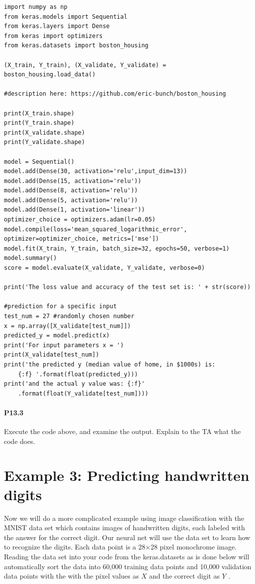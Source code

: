 \documentclass{book}
\theoremstyle{plain}
\theoremstyle{definition}
\numberwithin{exm}{chapter}
\theoremstyle{remark}
\theoremstyle{summary}
\theoremstyle{overview}
\begin{document}
\begin{lstlisting}
import numpy as np
from keras.models import Sequential
from keras.layers import Dense
from keras import optimizers
from keras.datasets import boston_housing

(X_train, Y_train), (X_validate, Y_validate) = boston_housing.load_data()

#description here: https://github.com/eric-bunch/boston_housing

print(X_train.shape)
print(Y_train.shape)
print(X_validate.shape)
print(Y_validate.shape)

model = Sequential()
model.add(Dense(30, activation='relu',input_dim=13))
model.add(Dense(15, activation='relu'))
model.add(Dense(8, activation='relu'))
model.add(Dense(5, activation='relu'))
model.add(Dense(1, activation='linear'))
optimizer_choice = optimizers.adam(lr=0.05)
model.compile(loss='mean_squared_logarithmic_error',
optimizer=optimizer_choice, metrics=['mse'])
model.fit(X_train, Y_train, batch_size=32, epochs=50, verbose=1)
model.summary()
score = model.evaluate(X_validate, Y_validate, verbose=0)

print('The loss value and accuracy of the test set is: ' + str(score))

#prediction for a specific input
test_num = 27 #randomly chosen number
x = np.array([X_validate[test_num]])
predicted_y = model.predict(x)
print('For input parameters x = ')
print(X_validate[test_num])
print('the predicted y (median value of home, in $1000s) is:
	{:f} '.format(float(predicted_y)))
print('and the actual y value was: {:f}'
	.format(float(Y_validate[test_num])))
\end{lstlisting}
\paragraph*{P13.3} Execute the code above, and examine the output. Explain to the TA what
the code does.


\section*{Example 3: Predicting handwritten digits}
Now we will do a more complicated example using image classification with the
MNIST data set which contains images of handwritten digits, each labeled with
the answer for the correct digit. Our neural net will use the data set to learn how
to recognize the digits. Each data point is a 28×28 pixel monochrome image.
Reading the data set into your code from the keras.datasets as is done below will
automatically sort the data into 60,000 training data points and 10,000 validation
data points with the with the pixel values as $X$ and the correct digit as $Y$ .\\
\end{document}
